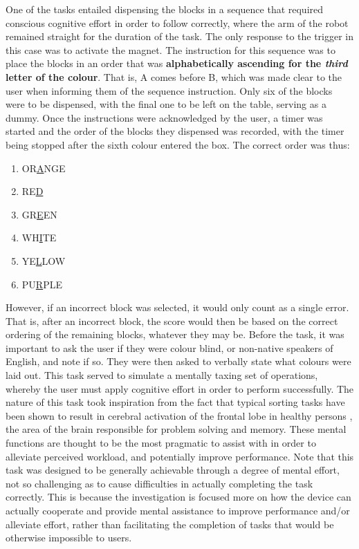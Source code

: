 \documentclass[11pt]{article}
\begin{document}
One of the tasks entailed dispensing the blocks in a sequence that required conscious cognitive effort in order to follow correctly, where the arm of the robot remained straight for the duration of the task. The only response to the trigger in this case was to activate the magnet. The instruction for this sequence was to place the blocks in an order that was \textbf{alphabetically ascending for the \textit{third} letter of the colour}. That is, A comes before B, which was made clear to the user when informing them of the sequence instruction. Only six of the blocks were to be dispensed, with the final one to be left on the table, serving as a dummy. Once the instructions were acknowledged by the user, a timer was started and the order of the blocks they dispensed was recorded, with the timer being stopped after the sixth colour entered the box. The correct order was thus:
\begin{enumerate}
\item{OR\underline{A}NGE}
\item{RE\underline{D}}
\item{GR\underline{E}EN}
\item{WH\underline{I}TE}
\item{YE\underline{L}LOW}
\item{PU\underline{R}PLE}
\end{enumerate}

However, if an incorrect block was selected, it would only count as a single error. That is, after an incorrect block, the score would then be based on the correct ordering of the remaining blocks, whatever they may be. Before the task, it was important to ask the user if they were colour blind, or non-native speakers of English, and note if so. They were then asked to verbally state what colours were laid out. This task served to simulate a mentally taxing set of operations, whereby the user must apply cognitive effort in order to perform successfully. The nature of this task took inspiration from the fact that typical sorting tasks have been shown to result in cerebral activation of the frontal lobe in healthy persons \cite{volz1997}, the area of the brain responsible for problem solving and memory. These mental functions are thought to be the most pragmatic to assist with in order to alleviate perceived workload, and potentially improve performance. Note that this task was designed to be generally achievable through a degree of mental effort, not so challenging as to cause difficulties in actually completing the task correctly. This is because the investigation is focused more on how the device can actually cooperate and provide mental assistance to improve performance and/or alleviate effort, rather than facilitating the completion of tasks that would be otherwise impossible to users.
\end{document}
